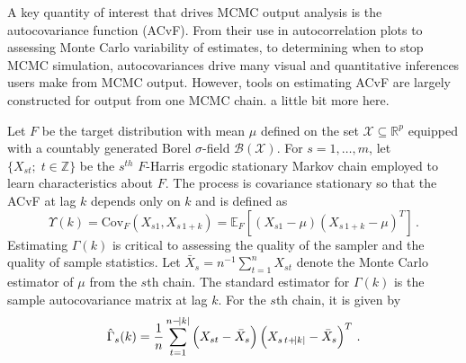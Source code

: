 \documentclass[11pt]{article}
\newcommand{\Cov}{\text{Cov}}
\newcommand{\X}{\mathcal{X}}
\theoremstyle{remark}
\begin{document}
A key quantity of interest that drives MCMC output analysis is the autocovariance function (ACvF). From their use in autocorrelation plots to assessing Monte Carlo variability of estimates, to determining when to stop MCMC simulation, autocovariances drive many visual and quantitative inferences users make from MCMC output. However, tools on estimating ACvF are largely constructed for output from one MCMC chain. {\color{blue} a little bit more here}.


Let $F$ be the target distribution with mean $\mu$ defined on the set $\X \subseteq \mathbb{R}^p$ equipped with a countably generated Borel $\sigma$-field $\mathcal{B}(\X)$. For $s = 1, \dots, m$, let $\{X_{st}; \; t \in \mathbb{Z}\}$ be the $s^{th}$ $F$-Harris ergodic stationary Markov chain \citep[see][for definitions]{meyn:twee:2009} employed to learn characteristics about $F$.
The process is covariance stationary so that
the ACvF at lag $k$ depends only on $k$ and is defined as 
%
\[
    \Upsilon(k) = \Cov_F(X_{s1}, X_{s\,1+k})= \mathbb{E}_F \left[(X_{s1} - \mu)(X_{s\,1+k} - \mu)^T \right]\,.
\]
Estimating $\Gamma(k)$ is critical to assessing the quality of the sampler and the quality of sample statistics. Let $\bar{X}_s = n^{-1} \sum_{t=1}^{n} X_{st}$ denote the Monte Carlo estimator of $\mu$ from the $s$th chain. The standard estimator for $\Gamma(k)$ is the sample autocovariance matrix at lag $k$. For the $s$th chain, it is given by
%
\begin{equation} \label{eq:empirical_ACvF}
    \hat{\Gamma}_s(k) = \dfrac{1}{n}\sum_{t=1}^{n-\abs{k}} \left(X_{st} - \bar{X}_s \right) \left(X_{s\, t+\abs{k}} - \bar{X}_s \right)^T\,.
\end{equation}
%
\end{document}
